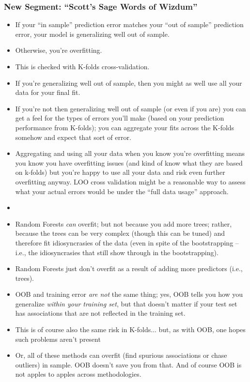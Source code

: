 \documentclass[xcolor={dvipsnames}]{beamer}
\begin{document}
\frame
{
\frametitle{New Segment: ``Scott's Sage Words of Wizdum''}

\tiny 
\begin{itemize}
\item If your ``in sample'' prediction error matches your ``out of sample'' prediction error, your model is generalizing well out of sample.
\item Otherwise, you're overfitting. 
\item This is checked with K-folds cross-validation.
\item If you're generalizing well out of sample, then you might as well use all your data for your final fit.
\item If you're not then generalizing well out of sample (or even if you are) you can get a feel for the types of errors you'll make (based on your prediction performance from K-folds); you can aggregate your fits across the K-folds somehow and expect that sort of error.  
\item Aggregating and using all your data when you know you're overfitting means you know you have overfitting issues (and kind of know what they are based on k-folds) but you're happy to use all your data and risk even further overfitting anyway.  LOO cross validation might be a reasonable way to assess what your actual errors would be under the ``full data usage'' approach. 
\item[] 
\item Random Forests \emph{can} overfit; but not because you add more trees; rather, because the trees can be very complex (though this can be tuned) and therefore fit idiosyncrasies of the data (even in spite of the bootstrapping -- i.e., the idiosyncrasies that still show through in the bootstrapping). 
\item Random Forests just don't overfit as a result of adding more predictors (i.e., trees).
\item OOB and training error \emph{are not} the same thing; yes, OOB tells you how you generalize \emph{within your training set}, but that doesn't matter if your test set has associations that are not reflected in the training set. 
\item This is of course also the same risk in K-folds... but, as with OOB, one hopes such problems aren't present
\item Or, all of these methods can overfit (find spurious associations or chase outliers) in sample.  OOB doesn't save you from that.  And of course OOB is not apples to apples  across methodologies. 

\end{itemize}}
\end{document}
